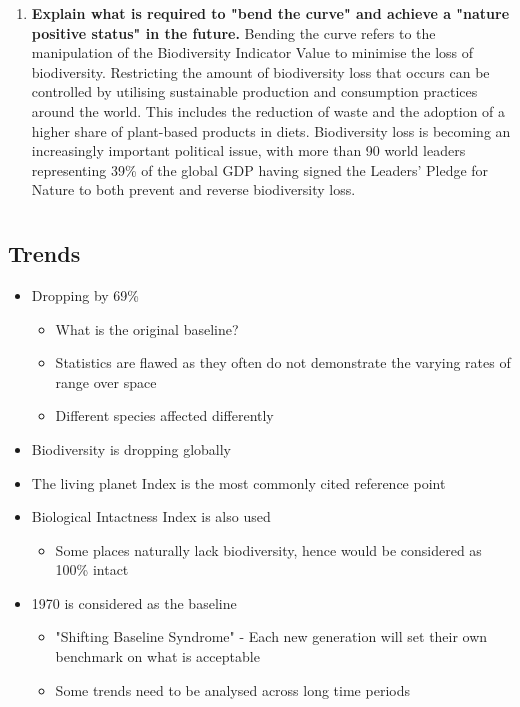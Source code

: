 \begin{enumerate}
		\item \textbf{Explain what is required to "bend the curve" and achieve a "nature positive status" in the future.}
			\subitem Bending the curve refers to the manipulation of the Biodiversity Indicator Value to minimise the loss of biodiversity. Restricting the amount of biodiversity loss that occurs can be controlled by utilising sustainable production and consumption practices around the world. This includes the reduction of waste and the adoption of a higher share of plant-based products in diets. Biodiversity loss is becoming an increasingly important political issue, with more than 90 world leaders representing 39\% of the global GDP having signed the Leaders' Pledge for Nature to both prevent and reverse biodiversity loss.
	\end{enumerate}

\section{} \label{23/05/2025}

	\subsection{Trends}
		
		\begin{itemize}
			\item Dropping by 69\%
				\begin{itemize}
					\item What is the original baseline?
					\item Statistics are flawed as they often do not demonstrate the varying rates of range over space
					\item Different species affected differently
				\end{itemize}
			\item Biodiversity is dropping globally
			\item The living planet Index is the most commonly cited reference point
			\item Biological Intactness Index is also used
				\begin{itemize}
					\item Some places naturally lack biodiversity, hence would be considered as 100\% intact 
				\end{itemize}
			\item 1970 is considered as the baseline
				\begin{itemize}
					\item "Shifting Baseline Syndrome" - Each new generation will set their own benchmark on what is acceptable
					\item Some trends need to be analysed across long time periods
				\end{itemize}
		\end{itemize}


